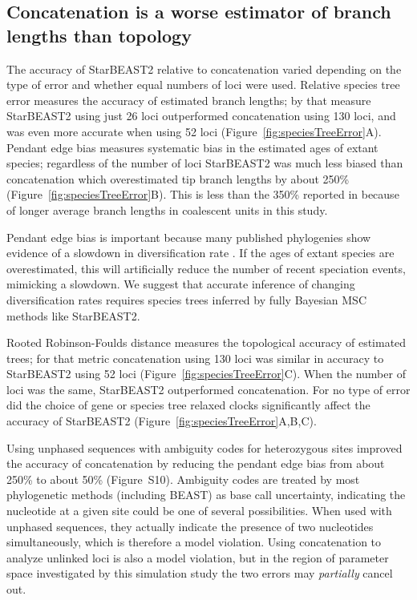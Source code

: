 \documentclass[12pt]{article}
\begin{document}
\subsection{Concatenation is a worse estimator of branch lengths than topology}

The accuracy of StarBEAST2 relative to concatenation varied depending on
the type of error and whether equal numbers of loci were used. Relative
species tree error measures the accuracy of estimated branch lengths; by that
measure StarBEAST2 using just 26 loci outperformed concatenation using 130
loci, and was even more accurate when using 52 loci
(Figure~\ref{fig:speciesTreeError}A). Pendant edge bias measures systematic
bias in the estimated ages of extant species; regardless of the number of loci
StarBEAST2 was much less biased than concatenation which overestimated tip
branch lengths by about 250\% (Figure~\ref{fig:speciesTreeError}B). This is
less than the 350\% reported in \cite{Ogilvie01052016} because of longer
average branch lengths in coalescent units in this study.

Pendant edge bias is important because many published phylogenies show
evidence of a slowdown in diversification rate \citep{Moen2014190}. If the
ages of extant species are overestimated, this will artificially reduce the
number of recent speciation events, mimicking a slowdown. We suggest that
accurate inference of changing diversification rates requires species trees
inferred by fully Bayesian MSC methods like StarBEAST2.

Rooted Robinson-Foulds distance measures the topological accuracy of estimated
trees; for that metric concatenation using 130 loci was similar in accuracy to
StarBEAST2 using 52 loci (Figure~\ref{fig:speciesTreeError}C). When the number
of loci was the same, StarBEAST2 outperformed concatenation. For no type of
error did the choice of gene or species tree relaxed clocks significantly
affect the accuracy of StarBEAST2 (Figure~\ref{fig:speciesTreeError}A,B,C).

Using unphased sequences with ambiguity codes for heterozygous sites improved
the accuracy of concatenation by reducing the pendant edge bias from about
250\% to about 50\% (Figure~S10). Ambiguity codes are treated by most
phylogenetic methods (including BEAST) as base call uncertainty,
indicating the nucleotide at a given site could be one of several
possibilities. When used with unphased sequences, they actually indicate the
presence of two nucleotides simultaneously, which is therefore a model violation.
Using concatenation to analyze unlinked loci is also a model violation, but in
the region of parameter space investigated by this simulation study the two
errors may \textit{partially} cancel out.
\end{document}
